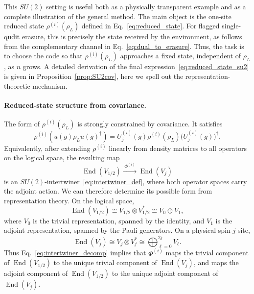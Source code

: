 \documentclass[10pt,twocolumn,superscriptaddress,aps,amsmath,amssymb,citeautoscript,floatfix,prx]{revtex4-2}
\theoremstyle{plain}
\theoremstyle{plain}
\theoremstyle{plain}
\theoremstyle{plain}
\theoremstyle{plain}
\theoremstyle{plain}
\theoremstyle{plain}
\theoremstyle{definition}
\theoremstyle{plain}
\begin{document}
This $SU(2)$ setting is useful both as a physically transparent example and as a complete illustration of the general method. 
The main object is the one-site reduced state $\rho^{(i)}(\rho_L)$ defined in Eq.~\eqref{eq:reduced_state}. For flagged single-qudit erasure, this is 
precisely the state received by the environment, as follows from the complementary channel in Eq.~\eqref{eq:dual_to_erasure}. 
Thus, the task is to choose the code so that $\rho^{(i)}(\rho_L)$ approaches a fixed state, independent of $\rho_L$, as $n$ grows. 
A detailed derivation of the final expression~\eqref{eq:reduced_state_su2} is given in Proposition~\ref{prop:SU2cov}, here we spell out the representation-theoretic mechanism.

\paragraph{Reduced-state structure from covariance.}
The form of $\rho^{(i)}(\rho_L)$ is strongly constrained by covariance. It satisfies
\begin{equation}\label{eq:reduced-state_cov_cond}
    \rho^{(i)}\!\left(u(g)\rho_Lu(g)^\dagger\right)
    =
    U_j^{(i)}(g)\rho^{(i)}(\rho_L)\bigl(U_j^{(i)}(g)\bigr)^\dagger .
\end{equation}
Equivalently, after extending $\rho^{(i)}$ linearly from density matrices to all operators on the logical space, the resulting map
\[
    \operatorname{End}(V_{1/2})
    \xrightarrow{\;\Phi^{(i)}\;}
    \operatorname{End}(V_j)
\]
is an $SU(2)$-intertwiner~\eqref{eq:intertwiner_def}, where both operator spaces carry the adjoint action. We can therefore determine 
its possible form from representation theory. On the logical space,
\[
    \operatorname{End}(V_{1/2})
    \cong
    V_{1/2}\otimes V_{1/2}^*
    \cong
    V_0\oplus V_1,
\]
where $V_0$ is the trivial representation, spanned by the identity, and $V_1$ is the adjoint representation, spanned by the Pauli generators. On a physical spin-$j$ site,
\[
    \operatorname{End}(V_j)
    \cong
    V_j\otimes V_j^*
    \cong
    \bigoplus_{\ell=0}^{2j} V_\ell .
\]
Thus Eq.~\eqref{eq:intertwiner_decomp} implies that $\Phi^{(i)}$ maps the trivial component of $\operatorname{End}(V_{1/2})$ to the unique trivial component of $\operatorname{End}(V_j)$, 
and maps the adjoint component of $\operatorname{End}(V_{1/2})$ to the unique adjoint component of $\operatorname{End}(V_j)$.
\end{document}
